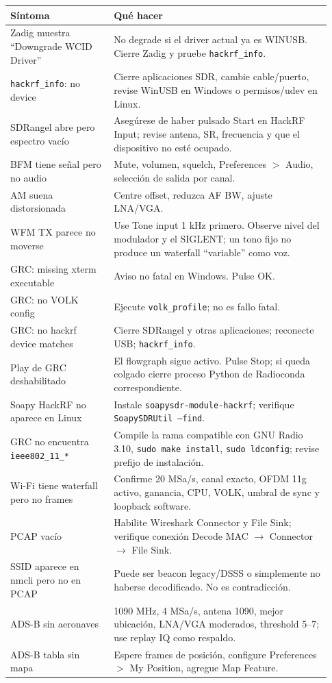 \begin{longtable}{@{}p{0.30\linewidth}p{0.63\linewidth}@{}}
\toprule
\textbf{Síntoma} & \textbf{Qué hacer} \\
\midrule
\endhead
Zadig muestra ``Downgrade WCID Driver'' & No degrade si el driver actual ya es WINUSB. Cierre Zadig y pruebe \texttt{hackrf\_info}. \\
\texttt{hackrf\_info}: no device & Cierre aplicaciones SDR, cambie cable/puerto, revise WinUSB en Windows o permisos/udev en Linux. \\
SDRangel abre pero espectro vacío & Asegúrese de haber pulsado Start en HackRF Input; revise antena, SR, frecuencia y que el dispositivo no esté ocupado. \\
BFM tiene señal pero no audio & Mute, volumen, squelch, Preferences $>$ Audio, selección de salida por canal. \\
AM suena distorsionada & Centre offset, reduzca AF BW, ajuste LNA/VGA. \\
WFM TX parece no moverse & Use Tone input 1 kHz primero. Observe nivel del modulador y el SIGLENT; un tono fijo no produce un waterfall ``variable'' como voz. \\
GRC: missing xterm executable & Aviso no fatal en Windows. Pulse OK. \\
GRC: no VOLK config & Ejecute \texttt{volk\_profile}; no es fallo fatal. \\
GRC: no hackrf device matches & Cierre SDRangel y otras aplicaciones; reconecte USB; \texttt{hackrf\_info}. \\
Play de GRC deshabilitado & El flowgraph sigue activo. Pulse Stop; si queda colgado cierre proceso Python de Radioconda correspondiente. \\
Soapy HackRF no aparece en Linux & Instale \texttt{soapysdr-module-hackrf}; verifique \texttt{SoapySDRUtil --find}. \\
GRC no encuentra \texttt{ieee802\_11\_*} & Compile la rama compatible con GNU Radio 3.10, \texttt{sudo make install}, \texttt{sudo ldconfig}; revise prefijo de instalación. \\
Wi-Fi tiene waterfall pero no frames & Confirme 20 MSa/s, canal exacto, OFDM 11g activo, ganancia, CPU, VOLK, umbral de sync y loopback software. \\
PCAP vacío & Habilite Wireshark Connector y File Sink; verifique conexión Decode MAC $\rightarrow$ Connector $\rightarrow$ File Sink. \\
SSID aparece en nmcli pero no en PCAP & Puede ser beacon legacy/DSSS o simplemente no haberse decodificado. No es contradicción. \\
ADS-B sin aeronaves & 1090 MHz, 4 MSa/s, antena 1090, mejor ubicación, LNA/VGA moderados, threshold 5--7; use replay IQ como respaldo. \\
ADS-B tabla sin mapa & Espere frames de posición, configure Preferences $>$ My Position, agregue Map Feature. \\
\bottomrule
\end{longtable}

